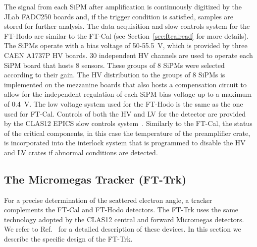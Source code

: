 The signal from each SiPM after amplification is continuously digitized by the JLab FADC250 boards and, if the
trigger condition is satisfied, samples are stored for further analysis. The data acquisition and slow controls system
for the FT-Hodo are similar to the FT-Cal (see Section~\ref{sec:ftcalread} for more details). The SiPMs operate
with a bias voltage of 50-55.5~V, which is provided by three CAEN A1737P HV boards. 30 independent HV channels
are used to operate each SiPM board that hosts 8 sensors. These groups of 8 SiPMs were selected according to their
gain. The HV distribution to the groups of 8 SiPMs is implemented on the mezzanine boards that also hosts a
compensation circuit to allow for the independent regulation of each SiPM bias voltage up to a maximum of 0.4~V. The
low voltage system used for the FT-Hodo is the same as the one used for FT-Cal. Controls of both the HV
and LV for the detector are provided by the CLAS12 EPICS slow controls system~\cite{daq}. Similarly to the FT-Cal,
the status of the critical components, in this case the temperature of the preamplifier crate, is incorporated into
the interlock system that is programmed to disable the HV and LV crates if abnormal conditions are detected.

\subsection{The Micromegas Tracker (FT-Trk)}

For a precise determination of the scattered electron angle, a tracker complements the FT-Cal and FT-Hodo
detectors. The FT-Trk uses the same technology adopted by the CLAS12 central and forward Micromegas detectors.
We refer to Ref.~\cite{mm} for a detailed description of  these devices. In this section we describe the specific
design of the FT-Trk.

